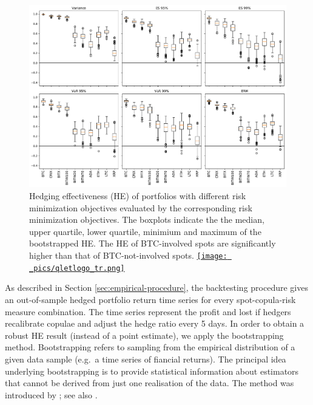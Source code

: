 \documentclass[11pt,a4paper,english]{article}
\begin{document}
\begin{figure}[t]
  \includegraphics[width=\textwidth]{_pics/HE_boxplot.pdf}
    \caption{Hedging effectiveness (HE) of portfolios with different risk minimization objectives evaluated by the corresponding risk minimization objectives.
              The boxplots indicate the the median, upper quartile, lower quartile, minimium and maximum of the bootstrapped HE.
              The HE of BTC-involved spots are significantly higher than that of BTC-not-involved spots.
    \href{https://github.com/QuantLet/Hedging-Cryptos-with-Bitcoin-Futures/blob/main/newToQuantlet/Pynotebooks/figures/figure 12.ipynb}{\texttt{[image: \_pics/qletlogo\_tr.png]}}
    }
    \label{fig:HEboxplot}
  \end{figure}

As described in Section \ref{sec:empirical-procedure}, the backtesting procedure gives
an out-of-sample hedged portfolio return time series for every spot-copula-risk measure combination. 
The time series represent the profit and lost if hedgers recalibrate copulae and adjust the hedge ratio every 5 days.  
In order to obtain a robust HE result (instead of a point estimate), we apply the bootstrapping method.
Bootstrapping refers to sampling from the empirical distribution of a
given data sample (e.g.\ a time series of fiancial returns). The
principal idea underlying bootstrapping is to provide statistical
information about estimators that cannot be derived from just one
realisation of the data. The method was introduced by
\cite{Efron1979}; see also \citep{efron1994introduction, davison1997bootstrap}. 
\end{document}
